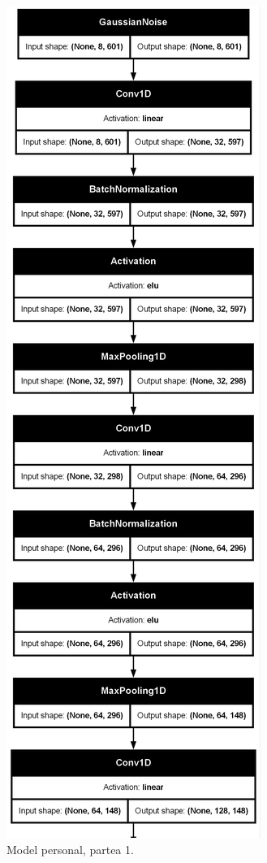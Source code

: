 \begin{figure}
    \centering
    \includegraphics[width=0.4\linewidth]{model_part1.png}
    \caption{Model personal, partea 1.}
    \label{fig:model_part1}
\end{figure}

